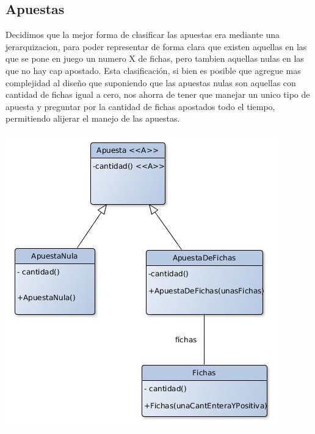 \subsection{Apuestas}
Decidimos que la mejor forma de clasificar las apuestas era mediante una jerarquizacion, para poder representar de forma clara que existen aquellas en las que se pone en juego un numero X de fichas, pero tambien aquellas nulas en las que no hay cap apostado. Esta clasificación, si bien es posible que agregue mas complejidad al diseño que suponiendo que las apuestas nulas son aquellas con cantidad de fichas igual a cero, nos ahorra de tener que manejar un unico tipo de apuesta y preguntar por la cantidad de fichas apostados todo el tiempo, permitiendo alijerar el manejo de las apuestas.
\begin{center}
\includegraphics[scale=0.4]{diseno/apuestas.jpg}
\end{center}



